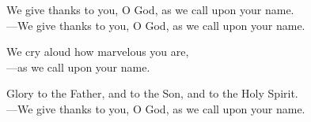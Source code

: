 \responsory

\noindent We give thanks to you, O God, as we call upon your name.\\
{\color{red}---\thinspace}We give thanks to you, O God, as we call upon your name.

\medskip\noindent We cry aloud how marvelous you are,\\
{\color{red}---\thinspace}as we call upon your name.

\medskip\noindent Glory to the Father, and to the Son, and to the Holy Spirit.\\
{\color{red}---\thinspace}We give thanks to you, O God, as we call upon your name.